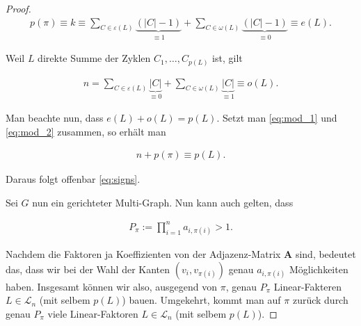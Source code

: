 \begin{proof}
                \begin{align} \label{eq:mod_1}
                    p(\pi)
                    \equiv
                    k
                    \equiv
                    \sum_{C \in \varepsilon(L)}
                        \underbrace
                        {
                            (|C| - 1)
                        }_{
                            \equiv 1
                        }
                    +
                    \sum_{C \in \omega(L)}
                        \underbrace
                        {
                            (|C| - 1)
                        }_{
                            \equiv 0
                        }
                    \equiv
                    e(L).
                \end{align}

                Weil $L$ direkte Summe der Zyklen $C_1, \dots, C_{p(L)}$ ist, gilt

                \begin{align} \label{eq:mod_2}
                    n
                    =
                    \sum_{C \in \varepsilon(L)} \underbrace{|C|}_{\equiv 0}
                    +
                    \sum_{C \in \omega(L)} \underbrace{|C|}_{\equiv 1}
                    \equiv
                    o(L).
                \end{align}

                Man beachte nun, dass $e(L) + o(L) = p(L)$.
                Setzt man \eqref{eq:mod_1} und \eqref{eq:mod_2} zusammen, so erhält man

                \begin{align*}
                    n + p(\pi) \equiv p(L).
                \end{align*}

                Daraus folgt offenbar \eqref{eq:signs}.

                Sei $G$ nun ein gerichteter Multi-Graph.
                Nun kann auch gelten, dass

                \begin{align*}
                    P_\pi
                    :=
                    \prod_{i=1}^n a_{i, \pi(i)}
                    >
                    1.
                \end{align*}

                Nachdem die Faktoren ja Koeffizienten von der Adjazenz-Matrix $\mathbf A$ sind, bedeutet das, dass wir bei der Wahl der Kanten $(v_i, v_{\pi(i)})$ genau $a_{i, \pi(i)}$ Möglichkeiten haben.
                Insgesamt können wir also, ausgegend von $\pi$, genau $P_\pi$ Linear-Fakteren $L \in \mathcal L_n$ (mit selbem $p(L)$) bauen.
                Umgekehrt, kommt man auf $\pi$ zurück durch genau $P_\pi$ viele Linear-Faktoren $L \in \mathcal L_n$ (mit selbem $p(L)$).

            \end{proof}

